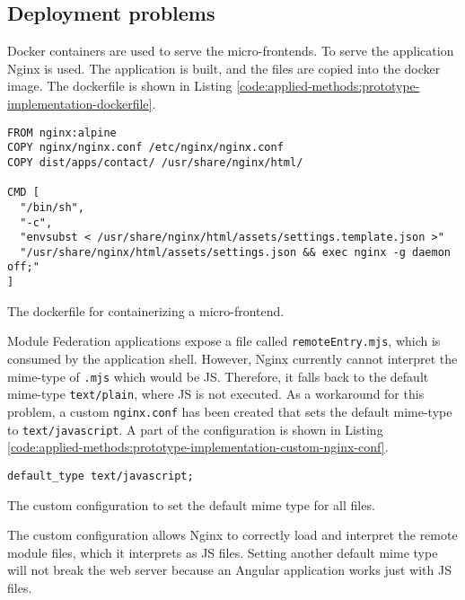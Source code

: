 \subsection{Deployment problems}\label{subsection:applied-methods:prototypical-implementation:nginx-problems}

Docker containers are used to serve the micro-frontends. To serve the application Nginx is used. The application is built, and the files are copied into the docker image. The dockerfile is shown in Listing \ref{code:applied-methods:prototype-implementation-dockerfile}.

\ifshowListings
  \begin{listing}[H]
  \begin{verbatim}
FROM nginx:alpine
COPY nginx/nginx.conf /etc/nginx/nginx.conf
COPY dist/apps/contact/ /usr/share/nginx/html/
    
CMD [
  "/bin/sh", 
  "-c", 
  "envsubst < /usr/share/nginx/html/assets/settings.template.json >" 
  "/usr/share/nginx/html/assets/settings.json && exec nginx -g daemon off;"
]
  \end{verbatim}
  \caption{The dockerfile for containerizing a micro-frontend.}\label{code:applied-methods:prototype-implementation-dockerfile}
  \end{listing}
\fi

\noindent Module Federation applications expose a file called \texttt{remoteEntry.mjs}, which is consumed by the application shell. However, Nginx currently cannot interpret the mime-type of \texttt{\*.mjs} which would be \ac{JS}. Therefore, it falls back to the default mime-type \texttt{text/plain}, where \ac{JS} is not executed. As a workaround for this problem, a custom \texttt{nginx.conf} has been created that sets the default mime-type to \texttt{text/javascript}. A part of the configuration is shown in Listing \ref{code:applied-methods:prototype-implementation-custom-nginx-conf}.

\ifshowListings
  \begin{listing}[H]
  \begin{verbatim}
default_type text/javascript;
  \end{verbatim}
  \caption{The custom configuration to set the default mime type for all files.}\label{code:applied-methods:prototype-implementation-custom-nginx-conf}
  \end{listing}
\fi

\noindent The custom configuration allows Nginx to correctly load and interpret the remote module files, which it interprets as \ac{JS} files. Setting another default mime type will not break the web server because an Angular application works just with \ac{JS} files.
